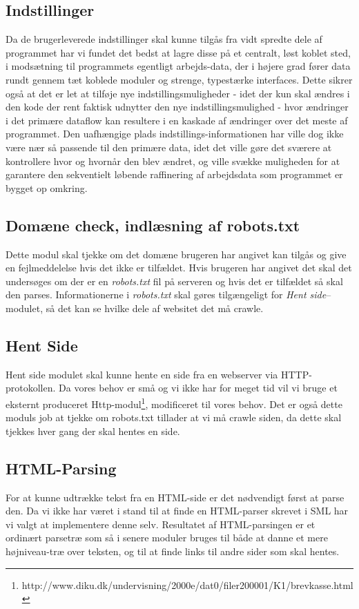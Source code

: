 \documentclass[a4paper,oneside,article, titlepage]{article}
\begin{document}
\subsection{Indstillinger}
Da de brugerleverede indstillinger skal kunne tilgås fra vidt spredte
dele af programmet har vi fundet det bedst at lagre disse på et
centralt, løst koblet sted, i modsætning til programmets egentligt
arbejds-data, der i højere grad fører data rundt gennem tæt koblede
moduler og strenge, typestærke interfaces. Dette sikrer også at det er
let at tilføje nye indstillingsmuligheder - idet der kun skal ændres i
den kode der rent faktisk udnytter den nye indstillingsmulighed - hvor
ændringer i det primære dataflow kan resultere i en kaskade af
ændringer over det meste af programmet. Den uafhængige plads
indstillings-informationen har ville dog ikke være nær så passende til
den primære data, idet det ville gøre det sværere at kontrollere hvor
og hvornår den blev ændret, og ville svække muligheden for at
garantere den sekventielt løbende raffinering af arbejdsdata som
programmet er bygget op omkring.

\subsection{Domæne check, indlæsning af robots.txt}
Dette modul skal tjekke om det domæne brugeren har angivet kan tilgås
og give en fejlmeddelelse hvis det ikke er tilfældet. Hvis brugeren
har angivet det skal det undersøges om der er en \textit{robots.txt}
fil på serveren og hvis det er tilfældet så skal den
parses. Informationerne i \textit{robots.txt} skal gøres tilgængeligt
for \textit{Hent side}--modulet, så det kan se hvilke dele af websitet
det må crawle.

\subsection{Hent Side}
Hent side modulet skal kunne hente en side fra en webserver via
HTTP-protokollen. Da vores behov er små og vi ikke har for meget tid
vil vi bruge et eksternt produceret
Http-modul\footnote{http://www.diku.dk/undervisning/2000e/dat0/filer200001/K1/brevkasse.html},
modificeret til vores behov. Det er også dette moduls job at tjekke om
robots.txt tillader at vi må crawle siden, da dette skal tjekkes hver
gang der skal hentes en side.

\subsection{HTML-Parsing}
For at kunne udtrække tekst fra en HTML-side er det nødvendigt først
at parse den. Da vi ikke har været i stand til at finde en HTML-parser
skrevet i SML har vi valgt at implementere denne selv. Resultatet af
HTML-parsingen er et ordinært parsetræ som så i senere moduler bruges
til både at danne et mere højniveau-træ over teksten, og til at finde
links til andre sider som skal hentes.
\end{document}
